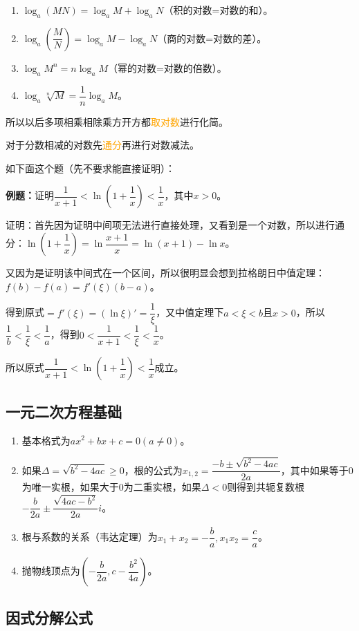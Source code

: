 \begin{enumerate}
    \item $\log_a(MN)=\log_aM+\log_aN$（积的对数=对数的和）。
    \item $\log_a(\dfrac{M}{N})=\log_aM-\log_aN$（商的对数=对数的差）。
    \item $\log_aM^n=n\log_aM$（幂的对数=对数的倍数）。
    \item $\log_a\sqrt[n]{M}=\dfrac{1}{n}\log_aM$。
\end{enumerate}

所以以后多项相乘相除乘方开方都\textcolor{orange}{取对数}进行化简。

对于分数相减的对数先\textcolor{orange}{通分}再进行对数减法。

如下面这个题（先不要求能直接证明）：

\textbf{例题：}证明$\dfrac{1}{x+1}<\ln(1+\dfrac{1}{x})<\dfrac{1}{x}$，其中$x>0$。

证明：首先因为证明中间项无法进行直接处理，又看到是一个对数，所以进行通分：$\ln(1+\dfrac{1}{x})=\ln\dfrac{x+1}{x}=\ln(x+1)-\ln x$。

又因为是证明该中间式在一个区间，所以很明显会想到拉格朗日中值定理：$f(b)-f(a)=f'(\xi)(b-a)$。

得到原式$=f'(\xi)=(\ln\xi)'=\dfrac{1}{\xi}$，又中值定理下$a<\xi<b$且$x>0$，所以$\dfrac{1}{b}<\dfrac{1}{\xi}<\dfrac{1}{a}$，得到$0<\dfrac{1}{x+1}<\dfrac{1}{\xi}<\dfrac{1}{x}$。

所以原式$\dfrac{1}{x+1}<\ln(1+\dfrac{1}{x})<\dfrac{1}{x}$成立。

\subsection{一元二次方程基础}

\begin{enumerate}
    \item 基本格式为$ax^2+bx+c=0(a\neq 0)$。
    \item 如果$\Delta=\sqrt{b^2-4ac}\geqslant 0$，根的公式为$x_{1,2}=\dfrac{-b\pm\sqrt{b^2-4ac}}{2a}$，其中如果等于0为唯一实根，如果大于0为二重实根，如果$\Delta<0$则得到共轭复数根$-\dfrac{b}{2a}\pm\dfrac{\sqrt{4ac-b^2}}{2a}i$。
    \item 根与系数的关系（韦达定理）为$x_1+x_2=-\dfrac{b}{a},x_1x_2=\dfrac{c}{a}$。
    \item 抛物线顶点为$(-\dfrac{b}{2a},c-\dfrac{b^2}{4a})$。
\end{enumerate}

\subsection{因式分解公式}


